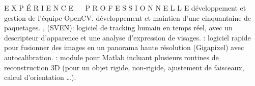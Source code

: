 \begin{rubric}{E X P \'{E} R I E N C E ~~ P R O F E S S I O N N E L L E}
\entry*[OpenCV]
d\'{e}veloppement et gestion de l'\'{e}quipe OpenCV.
\entry*[ROS]
d\'{e}veloppement et maintien d'une cinquantaine de paquetages.
, (SVEN): logiciel de tracking humain en temps r\'{e}el, avec 
un descripteur d'apparence et une analyse d'expression de visages.
: logiciel rapide pour fusionner des images en un panorama haute r\'{e}solution (Gigapixel) avec 
autocalibration.
: module pour Matlab incluant plusieurs routines de reconstruction 3D (pour un objet rigide, non-rigide, ajustement de faisceaux, calcul d'orientation \ldots).
\end{rubric}


